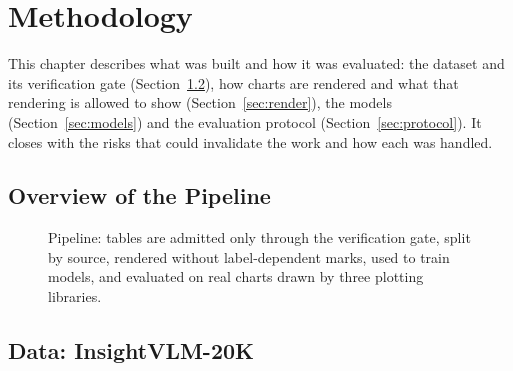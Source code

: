 \chapter{Methodology}
\label{ch:method}

This chapter describes what was built and how it was evaluated: the dataset and its
verification gate (Section~\ref{sec:data}), how charts are rendered and what that
rendering is allowed to show (Section~\ref{sec:render}), the models
(Section~\ref{sec:models}) and the evaluation protocol (Section~\ref{sec:protocol}).
It closes with the risks that could invalidate the work and how each was handled.

\section{Overview of the Pipeline}

\begin{figure}[h]\centering
{}
\caption{Pipeline: tables are admitted only through the verification gate, split by
source, rendered without label-dependent marks, used to train models, and evaluated
on real charts drawn by three plotting libraries.}
\label{fig:pipeline}
\end{figure}

\section{Data: InsightVLM-20K}
\label{sec:data}

